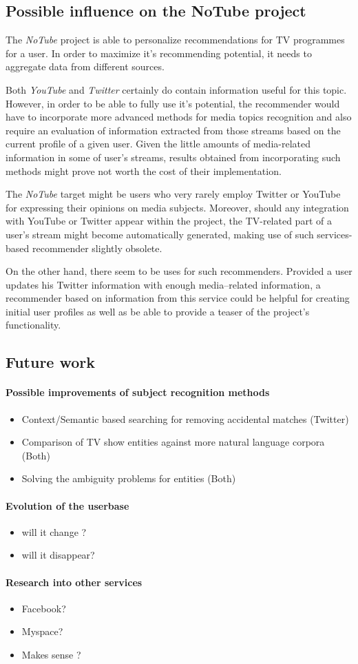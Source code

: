 \subsection{Possible influence on the NoTube project}

The \textit{NoTube} project is able to personalize recommendations for TV programmes for a user. In order to maximize
it's recommending potential, it needs to aggregate data from different sources.

Both \textit{YouTube} and \textit{Twitter} certainly do contain information useful for this topic. However, in order to be
able to fully use it's potential, the recommender would have to incorporate more advanced methods for media topics
recognition and also require an evaluation of information extracted from those streams based on the current profile
of a given user. Given the little amounts of media-related information in some of user's streams, results obtained from incorporating such methods might prove not worth the cost of their implementation.

The \textit{NoTube} target might be users who very rarely employ Twitter or YouTube for expressing their
opinions on media subjects. Moreover, should any integration with YouTube or Twitter appear within the project, the TV-related
part of a user's stream might become automatically generated, making use of such services-based recommender slightly obsolete.

On the other hand, there seem to be uses for such recommenders. Provided a user updates his Twitter information with enough
media--related information, a recommender based on information from this service could be helpful for creating initial
user profiles as well as be able to provide a teaser of the project's functionality.

\subsection{Future work}

\paragraph{Possible improvements of subject recognition methods}
\begin{itemize}
  \item Context/Semantic based searching for removing accidental matches (Twitter)
  \item Comparison of TV show entities against more natural language corpora (Both)
  \item Solving the ambiguity problems for entities (Both)
\end{itemize}
\paragraph{Evolution of the userbase}
\begin{itemize}
  \item will it change ?
  \item will it disappear?
\end{itemize}
\paragraph{Research into other services}
\begin{itemize}
  \item Facebook?
  \item Myspace?
  \item Makes sense ?
\end{itemize}